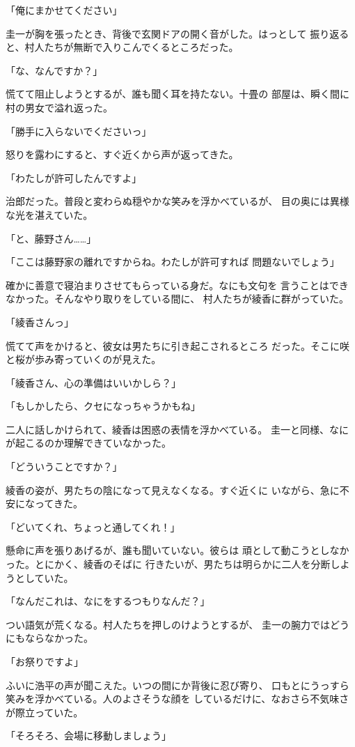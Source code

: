 ﻿\documentclass[
    book,tate,
    line_length=30zw,
    jafontsize=12pt,
    paper=b5j,
    landscape,
    ]{jlreq}
\begin{document}
「俺にまかせてください」

圭一が胸を張ったとき、背後で玄関ドアの開く音がした。はっとして
振り返ると、村人たちが無断で入りこんでくるところだった。

「な、なんですか？」

慌てて阻止しようとするが、誰も聞く耳を持たない。十畳の
部屋は、瞬く間に村の男女で溢れ返った。

「勝手に入らないでくださいっ」

怒りを露わにすると、すぐ近くから声が返ってきた。

「わたしが許可したんですよ」

治郎だった。普段と変わらぬ穏やかな笑みを浮かべているが、
目の奥には異様な光を湛えていた。

「と、藤野さん……」

「ここは藤野家の離れですからね。わたしが許可すれば
問題ないでしょう」

確かに善意で寝泊まりさせてもらっている身だ。なにも文句を
言うことはできなかった。そんなやり取りをしている間に、
村人たちが綾香に群がっていた。

「綾香さんっ」

慌てて声をかけると、彼女は男たちに引き起こされるところ
だった。そこに咲と桜が歩み寄っていくのが見えた。

「綾香さん、心の準備はいいかしら？」

「もしかしたら、クセになっちゃうかもね」

二人に話しかけられて、綾香は困惑の表情を浮かべている。
圭一と同様、なにが起こるのか理解できていなかった。

「どういうことですか？」

綾香の姿が、男たちの陰になって見えなくなる。すぐ近くに
いながら、急に不安になってきた。

「どいてくれ、ちょっと通してくれ！」

懸命に声を張りあげるが、誰も聞いていない。彼らは
頑として動こうとしなかった。とにかく、綾香のそばに
行きたいが、男たちは明らかに二人を分断しようとしていた。

「なんだこれは、なにをするつもりなんだ？」

つい語気が荒くなる。村人たちを押しのけようとするが、
圭一の腕力ではどうにもならなかった。

「お祭りですよ」

ふいに浩平の声が聞こえた。いつの間にか背後に忍び寄り、
口もとにうっすら笑みを浮かべている。人のよさそうな顔を
しているだけに、なおさら不気味さが際立っていた。

「そろそろ、会場に移動しましょう」
\end{document}
